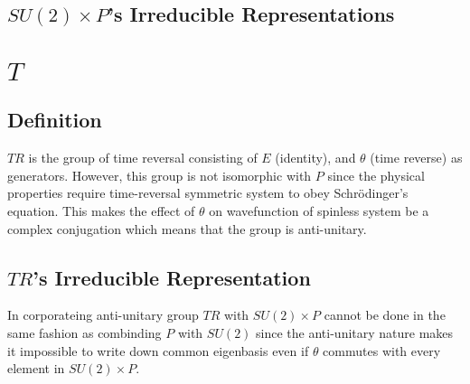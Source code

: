 \documentclass[preprint, 12pt]{revtex4-2}
\numberwithin{equation}{section}
\begin{document}
\subsection{$SU(2)\times P$'s Irreducible Representations}

\newpage
\section{$T$}

\subsection{Definition}
$TR$ is the group of time reversal consisting of $E$ (identity), and $\theta$ (time reverse) as generators. However, this group is not isomorphic with $P$ since the physical properties require time-reversal symmetric system to obey Schr\"odinger's equation. This makes the effect of $\theta$ on wavefunction of spinless system be a complex conjugation which means that the group is anti-unitary.

\subsection{$TR$'s Irreducible Representation}
In corporateing anti-unitary group $TR$ with $SU(2)\times P$ cannot be done in the same fashion as combinding $P$ with $SU(2)$ since the anti-unitary nature makes it impossible to write down common eigenbasis even if $\theta$ commutes with every element in $SU(2)\times P$.
\end{document}
